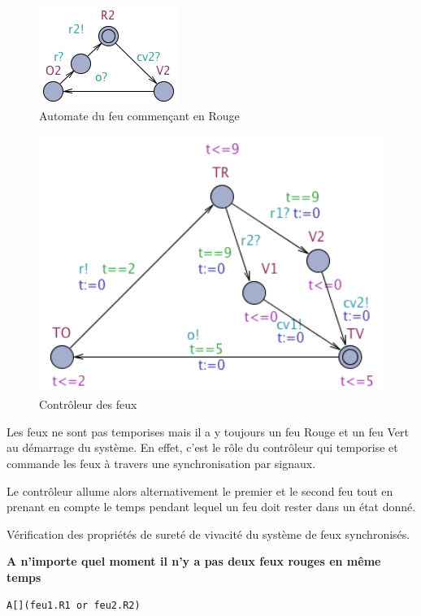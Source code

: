 \documentclass[11pt]{article}
\begin{document}
\begin{figure}[H]
	\centering
	\includegraphics{ressources/part2/Q8-2.png}
	\caption{Automate du feu commençant en Rouge}
\end{figure}

\begin{figure}[H]
	\centering
	\includegraphics[width=1\textwidth]{ressources/part2/Q8-3.png}
	\caption{Contrôleur des feux}
\end{figure}

Les feux ne sont pas temporises mais il a y toujours un feu Rouge et un feu Vert au démarrage du système. En effet, c'est le rôle du contrôleur qui temporise et commande les feux à travers une synchronisation par signaux. 

Le contrôleur allume alors alternativement le premier et le second feu tout en prenant en compte le temps pendant lequel un feu doit rester dans un état donné.

Vérification des propriétés de sureté de vivacité du système de feux synchronisés.

\textbf{A n'importe quel moment il n'y a pas deux feux rouges en même temps}
\begin{verbatim}
A[](feu1.R1 or feu2.R2)
\end{verbatim}
\end{document}
